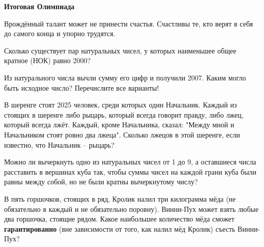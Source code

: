 \centerline{\bf \Huge Итоговая Олимпиада}

\begin{flushright}
        \scriptsize{Врождённый талант может не принести счастья. Счастливы те, кто верят в себя до самого конца и упорно трудятся.}
\end{flushright}

 Сколько существует пар натуральных чисел, у которых наименьшее общее кратное (НОК) равно 2000?


 Из натурального числа вычли сумму его цифр и получили 2007. Каким могло быть исходное число? Перечислите все варианты!

  В шеренге стоят 2025 человек, среди которых один Начальник. Каждый из стоящих в шеренге либо рыцарь, который всегда говорит правду, либо лжец, который всегда лжёт. Каждый, кроме Начальника, сказал: "Между мной и Начальником стоят ровно два лжеца". Сколько лжецов в этой шеренге, если известно, что Начальник – рыцарь?

 Можно ли вычеркнуть одно из натуральных чисел от 1 до 9, а
оставшиеся числа расставить в вершинах куба так, чтобы суммы чисел на каждой грани куба
были равны между собой, но не были кратны вычеркнутому числу?

 В пять горшочков, стоящих в ряд, Кролик налил три килограмма мёда (не обязательно в каждый и не обязательно поровну). Винни-Пух может взять любые два горшочка, стоящие рядом. Какое наибольшее количество мёда сможет \textbf{гарантированно} (вне зависимости от того, как налил мёд Кролик) съесть Винни-Пух?
